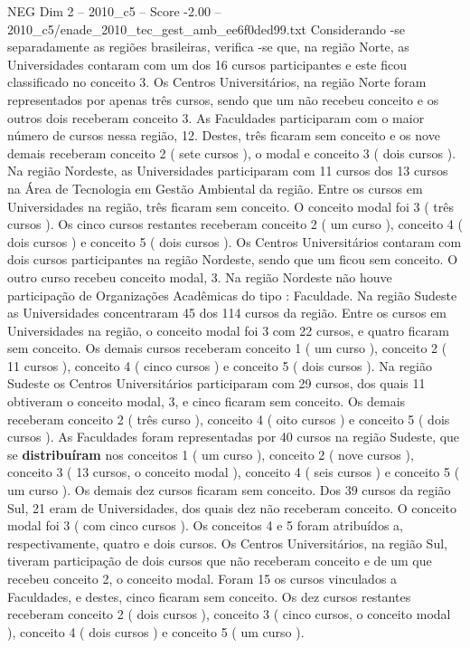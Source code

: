 \begin{textsample}{NEG Dim 2 – 2010\_c5 – Score -2.00 – 2010\_c5/enade\_2010\_tec\_gest\_amb\_ee6f0ded99.txt}
Considerando -se separadamente as regiões brasileiras, verifica -se que, na região Norte, as Universidades contaram com um dos 16 cursos participantes e este ficou classificado no conceito 3.
Os Centros Universitários, na região Norte foram representados por apenas três cursos, sendo que um não recebeu conceito e os outros dois receberam conceito 3.
As Faculdades participaram com o maior número de cursos nessa região, 12.
Destes, três ficaram sem conceito e os nove demais receberam conceito 2 ( sete cursos ), o modal e conceito 3 ( dois cursos ).
Na região Nordeste, as Universidades participaram com 11 cursos dos 13 cursos na Área de Tecnologia em Gestão Ambiental da região.
Entre os cursos em Universidades na região, três ficaram sem conceito.
O conceito modal foi 3 ( três cursos ).
Os cinco cursos restantes receberam conceito 2 ( um curso ), conceito 4 ( dois cursos ) e conceito 5 ( dois cursos ).
Os Centros Universitários contaram com dois cursos participantes na região Nordeste, sendo que um ficou sem conceito.
O outro curso recebeu conceito modal, 3.
Na região Nordeste não houve participação de Organizações Acadêmicas do tipo : Faculdade.
Na região Sudeste as Universidades concentraram 45 dos 114 cursos da região.
Entre os cursos em Universidades na região, o conceito modal foi 3 com 22 cursos, e quatro ficaram sem conceito.
Os demais cursos receberam conceito 1 ( um curso ), conceito 2 ( 11 cursos ), conceito 4 ( cinco cursos ) e conceito 5 ( dois cursos ).
Na região Sudeste os Centros Universitários participaram com 29 cursos, dos quais 11 obtiveram o conceito modal, 3, e cinco ficaram sem conceito.
Os demais receberam conceito 2 ( três curso ), conceito 4 ( oito cursos ) e conceito 5 ( dois cursos ).
As Faculdades foram representadas por 40 cursos na região Sudeste, que se \textbf{distribuíram} nos conceitos 1 ( um curso ), conceito 2 ( nove cursos ), conceito 3 ( 13 cursos, o conceito modal ), conceito 4 ( seis cursos ) e conceito 5 ( um curso ).
Os demais dez cursos ficaram sem conceito.
Dos 39 cursos da região Sul, 21 eram de Universidades, dos quais dez não receberam conceito.
O conceito modal foi 3 ( com cinco cursos ).
Os conceitos 4 e 5 foram atribuídos a, respectivamente, quatro e dois cursos.
Os Centros Universitários, na região Sul, tiveram participação de dois cursos que não receberam conceito e de um que recebeu conceito 2, o conceito modal.
Foram 15 os cursos vinculados a Faculdades, e destes, cinco ficaram sem conceito.
Os dez cursos restantes receberam conceito 2 ( dois cursos ), conceito 3 ( cinco cursos, o conceito modal ), conceito 4 ( dois cursos ) e conceito 5 ( um curso ).

\end{textsample}
